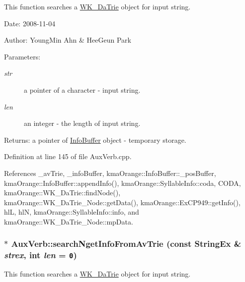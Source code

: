 This function searches a \hyperlink{classkmaOrange_1_1WK__DaTrie}{WK\_\-DaTrie} object for input string. 

\begin{Desc}
\item[Date:]2008-11-04 \end{Desc}
\begin{Desc}
\item[Author:]YoungMin Ahn \& HeeGeun Park \end{Desc}
\begin{Desc}
\item[Parameters:]
\begin{description}
\item[{\em str}]a pointer of a character - input string. \item[{\em len}]an integer - the length of input string. \end{description}
\end{Desc}
\begin{Desc}
\item[Returns:]a pointer of \hyperlink{classkmaOrange_1_1InfoBuffer}{InfoBuffer} object - temporary storage. \end{Desc}


Definition at line 145 of file AuxVerb.cpp.

References \_\-avTrie, \_\-infoBuffer, kmaOrange::InfoBuffer::\_\-posBuffer, kmaOrange::InfoBuffer::appendInfo(), kmaOrange::SyllableInfo::coda, CODA, kmaOrange::WK\_\-DaTrie::findNode(), kmaOrange::WK\_\-DaTrie\_\-Node::getData(), kmaOrange::ExCP949::getInfo(), hlL, hlN, kmaOrange::SyllableInfo::info, and kmaOrange::WK\_\-DaTrie\_\-Node::mpData.\hypertarget{classkmaOrange_1_1AuxVerb_d08311a7c795a29ed267dfdff4e804d3}{
\subsubsection[{searchNgetInfoFromAvTrie}]{ $\ast$ AuxVerb::searchNgetInfoFromAvTrie (const {\bf StringEx} \& {\em strex}, \/  int {\em len} = {\tt 0})}}
\label{classkmaOrange_1_1AuxVerb_d08311a7c795a29ed267dfdff4e804d3}


This function searches a \hyperlink{classkmaOrange_1_1WK__DaTrie}{WK\_\-DaTrie} object for input string. 

